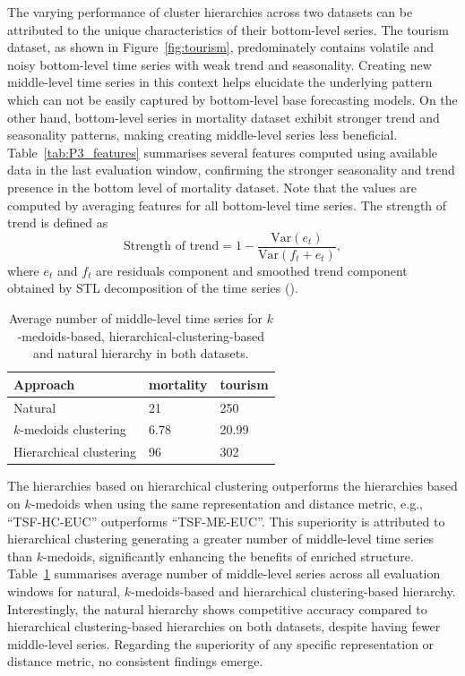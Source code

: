 \documentclass[a4paper,review,12pt,authoryear]{elsarticle}
\begin{document}
The varying performance of cluster hierarchies across two datasets can be attributed to the unique characteristics of their bottom-level series.
The tourism dataset, as shown in Figure~\ref{fig:tourism}, predominately contains volatile and noisy bottom-level time series with weak trend and seasonality. Creating new middle-level time series in this context helps elucidate the underlying pattern which can not be easily captured by bottom-level base forecasting models. 
On the other hand, bottom-level series in mortality dataset exhibit stronger trend and seasonality patterns, making creating middle-level series less beneficial. Table~\ref{tab:P3_features} summarises several features computed using available data in the last evaluation window, confirming the stronger seasonality and trend presence in the bottom level of mortality dataset. Note that the values are computed by averaging features for all bottom-level time series. The strength of trend is defined as 
\[
\text{Strength of trend} = 1-\frac{\text{Var}(e_t)}{\text{Var}(f_t+e_t)},
\]
where $e_t$ and $f_t$ are residuals component and smoothed trend component obtained by STL decomposition of the time series (\citealp{tsfeatures}).

\begin{table}[h!]
    \centering
    \caption{\label{tab:P3_number_series}Average number of middle-level time series for $k$-medoids-based, hierarchical-clustering-based and natural hierarchy in both datasets.}
    \begin{tabular}{lll}
    \toprule
        Approach & mortality & tourism \\ \midrule
     Natural & 21 & 250 \\ 
        $k$-medoids clustering & 6.78 & 20.99 \\ 
        Hierarchical clustering & 96 & 302 \\ \bottomrule
    \end{tabular}
\end{table}

The hierarchies based on hierarchical clustering outperforms the hierarchies based on $k$-medoids when using the same representation and distance metric, e.g., ``TSF-HC-EUC'' outperforms ``TSF-ME-EUC''.
This superiority is attributed to hierarchical clustering generating a greater number of middle-level time series than $k$-medoids, significantly enhancing the benefits of enriched structure.
Table~\ref{tab:P3_number_series} summarises average number of middle-level series across all evaluation windows for natural, $k$-medoids-based and hierarchical clustering-based hierarchy. 
Interestingly, the natural hierarchy shows competitive accuracy compared to hierarchical clustering-based hierarchies on both datasets, despite having fewer middle-level series.
Regarding the superiority of any specific representation or distance metric, no consistent findings emerge. 
   
\end{document}
